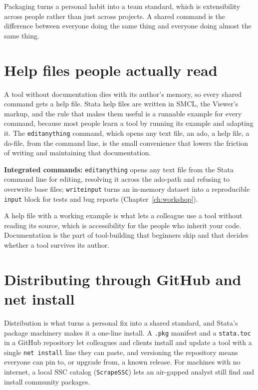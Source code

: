 \documentclass[
    a4paper,
    fontsize=10pt,
    twoside=true,
    numbers=noenddot,
]{kaobook}
\begin{document}
Packaging turns a personal habit into a team standard, which is extensibility across people rather than just across projects. A shared command is the difference between everyone doing the same thing and everyone doing almost the same thing.

\section{Help files people actually read}
A tool without documentation dies with its author's memory, so every shared command gets a help file. Stata help files are written in SMCL, the Viewer's markup, and the rule that makes them useful is a runnable example for every command, because most people learn a tool by running its example and adapting it. The \texttt{editanything} command, which opens any text file, an ado, a help file, a do-file, from the command line, is the small convenience that lowers the friction of writing and maintaining that documentation.

\begin{kaobox}[frametitle=Package Integration: \texttt{editanything} and \texttt{writeinput}]
\textbf{Integrated commands:} \texttt{editanything} opens any text file from the Stata command line for editing, resolving it across the ado-path and refusing to overwrite base files; \texttt{writeinput} turns an in-memory dataset into a reproducible \texttt{input} block for tests and bug reports (Chapter~\ref{ch:workshop}).
\end{kaobox}

A help file with a working example is what lets a colleague use a tool without reading its source, which is accessibility for the people who inherit your code. Documentation is the part of tool-building that beginners skip and that decides whether a tool survives its author.

\section{Distributing through GitHub and net install}
Distribution is what turns a personal fix into a shared standard, and Stata's package machinery makes it a one-line install. A \texttt{.pkg} manifest and a \texttt{stata.toc} in a GitHub repository let colleagues and clients install and update a tool with a single \texttt{net install} line they can paste, and versioning the repository means everyone can pin to, or upgrade from, a known release. For machines with no internet, a local SSC catalog (\texttt{ScrapeSSC}) lets an air-gapped analyst still find and install community packages.
\end{document}
